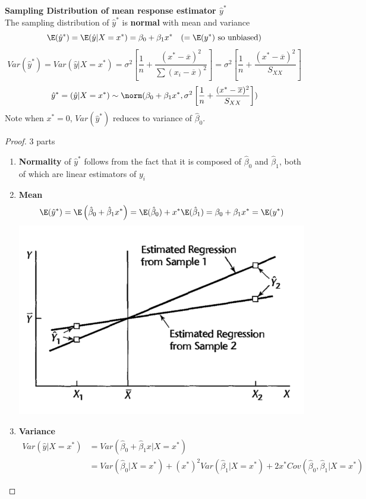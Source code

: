 \documentclass[11pt]{article}
\begin{document}
\begin{defn*}
	\textbf{Sampling Distribution of mean response estimator $\hat{y}^*$} \\
	The sampling distribution of $\hat{y}^*$ is \textbf{normal} with mean and variance 
	\[
		\E(\hat{y}^*) = \E(\hat{y}|X=x^*) = \beta_0 + \beta_1 x^* \quad \text{($= \E(y^*)$ so unbiased)}
	\]
	\[
		Var(\hat{y}^*) = Var(\hat{y}|X=x^*) = \sigma^2 \left[ \frac{1}{n} + \frac{(x^* - \overline{x})^2}{\sum (x_i - \overline{x})^2} \right] = \sigma^2 \left[ \frac{1}{n} + \frac{(x^* - \overline{x})^2}{S_{XX}} \right]
	\]
	\[
		\hat{y}^* = (\hat{y}|X=x^*) \sim \norm(\beta_0 + \beta_1 x^*, \sigma^2 \left[ \frac{1}{n} + \frac{(x^* - \overline{x})^2}{S_{XX}} \right])
	\]
	Note when $x^*=0$, $Var(\hat{y}^*)$ reduces to variance of $\hat{\beta}_0$. 
	\begin{proof}
		3 parts
		\begin{enumerate}
			\item \textbf{Normality} of $\hat{y}^*$ follows from the fact that it is composed of $\hat{\beta}_0$ and $\hat{\beta}_1$, both of which are linear estimators of $y_i$
			\item \textbf{Mean}
			\[
				\E(\hat{y}^*)=  \E\left( \hat{\beta}_0 + \hat{\beta}_1 x^* \right) = \E(\hat{\beta}_0) + x^* \E(\hat{\beta}_1) = \beta_0 + \beta_1 x^* = \E(y^*)
			\]
			\includegraphics[width=\textwidth/2]{mean_response_var_plot}
			\item \textbf{Variance} 
			\begin{align*}
				Var(\hat{y} | X=x^*)
				&= Var(\hat{\beta}_0 + \hat{\beta}_1 x | X=x^*)\\
				&= Var(\hat{\beta}_0 | X=x^*) + (x^*)^2 Var(\hat{\beta}_1 | X = x^*) + 2x^* Cov(\hat{\beta}_0, \hat{\beta}_1 | X=x^*)

\end{align*}
\end{enumerate}
\end{proof}
\end{defn*}
\end{document}
